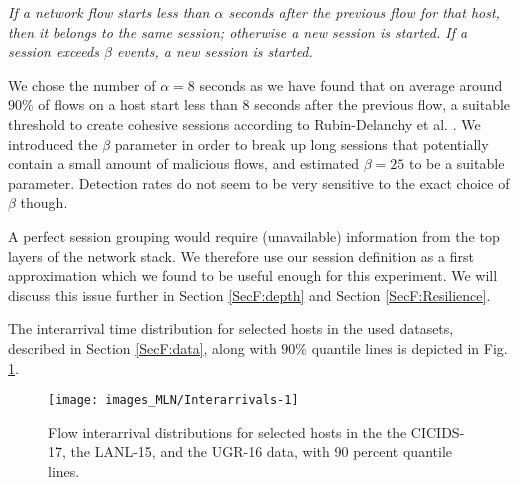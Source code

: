 \textit{If a network flow starts less than $\alpha$ seconds after the previous flow for that host, then it belongs to the same session; otherwise a new session is started. If a session exceeds $\beta$ events, a new session is started.}


 
We chose the number of $\alpha=8$ seconds as we have found that on average around $90\%$ of flows on a host start less than $8$ seconds after the previous flow, a suitable threshold to create cohesive sessions according to Rubin-Delanchy et al. \cite{rubin2014three}. We introduced the $\beta$ parameter in order to break up long sessions that potentially contain a small amount of malicious flows, and estimated $\beta=25$ to be a suitable parameter. Detection rates do not seem to be very sensitive to the exact choice of $\beta$ though.

A perfect session grouping would require (unavailable) information from the top layers of the network stack. We therefore use our session definition as  a first approximation which we found to be useful enough for this experiment. We will discuss this issue further in Section \ref{SecF:depth} and Section \ref{SecF:Resilience}.


The interarrival time distribution for selected hosts in the used datasets, described in Section \ref{SecF:data}, along with $90\%$ quantile lines is depicted in Fig. \ref{figF:Interarrivals}.

\begin{figure}
\centering
\texttt{[image: images\_MLN/Interarrivals-1]}
 \caption[Flow interarrival distributions for selected hosts in the the CICIDS-17, the LANL-15, and the UGR-16 data, with 90 percent quantile lines]{Flow interarrival distributions for selected hosts in the the CICIDS-17, the LANL-15, and the UGR-16 data, with 90 percent quantile lines.}\label{figF:Interarrivals}
\end{figure}

